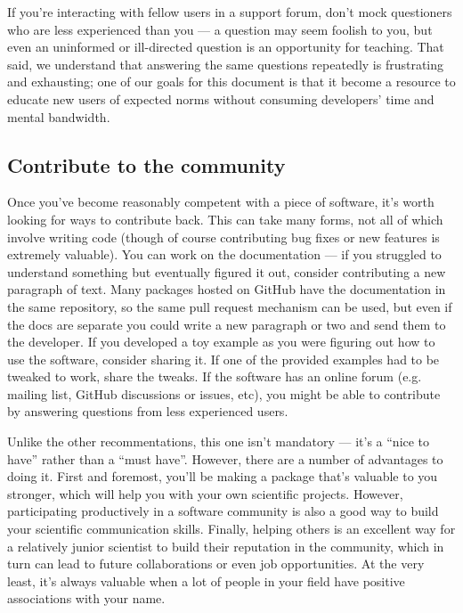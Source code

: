 \documentclass[9pt,training]{livecoms}
\begin{document}
If you're interacting with fellow users in a support forum, don't mock
questioners who are less experienced than you --- a question may seem foolish to
you, but even an uninformed or ill-directed question is an opportunity for
teaching. That said, we understand that answering the same questions repeatedly
is frustrating and exhausting; one of our goals for this document is that it
become a resource to educate new users of expected norms without consuming
developers' time and mental bandwidth.

\subsection{Contribute to the community}

Once you've become reasonably competent with a piece of software, it's worth
looking for ways to contribute back. This can take many forms, not all of which
involve writing code (though of course contributing bug fixes or new features is
extremely valuable). You can work on the documentation --- if you struggled to
understand something but eventually figured it out, consider contributing a new
paragraph of text. Many packages hosted on GitHub have the documentation in the
same repository, so the same pull request mechanism can be used, but even if the
docs are separate you could write a new paragraph or two and send them to the
developer. If you developed a toy example as you were figuring out how to use
the software, consider sharing it. If one of the provided examples had to be
tweaked to work, share the tweaks. If the software has an online forum (e.g.
mailing list, GitHub discussions or issues, etc), you might be able to
contribute by answering questions from less experienced users.

Unlike the other recommentations, this one isn't mandatory --- it's a ``nice to
have'' rather than a ``must have''. However, there are a number of advantages to
doing it. First and foremost, you'll be making a package that's valuable to you
stronger, which will help you with your own scientific projects. However,
participating productively in a software community is also a good way to build
your scientific communication skills. Finally, helping others is an excellent
way for a relatively junior scientist to build their reputation in the
community, which in turn can lead to future collaborations or even job
opportunities. At the very least, it's always valuable when a lot of people in
your field have positive associations with your name.
\end{document}
